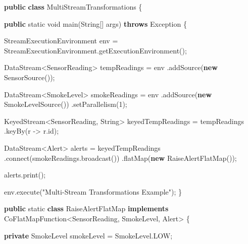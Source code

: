 \documentclass[cn,11pt,chinese]{elegantbook}
\newenvironment{Shaded}{}{}
\newcommand{\BuiltInTok}[1]{#1}
\newcommand{\DataTypeTok}[1]{\textcolor[rgb]{0.56,0.13,0.00}{#1}}
\newcommand{\DecValTok}[1]{\textcolor[rgb]{0.25,0.63,0.44}{#1}}
\newcommand{\FunctionTok}[1]{\textcolor[rgb]{0.02,0.16,0.49}{#1}}
\newcommand{\KeywordTok}[1]{\textcolor[rgb]{0.00,0.44,0.13}{\textbf{#1}}}
\newcommand{\NormalTok}[1]{#1}
\newcommand{\StringTok}[1]{\textcolor[rgb]{0.25,0.44,0.63}{#1}}
\begin{document}
\begin{Shaded}
\begin{Highlighting}[]
\KeywordTok{public} \KeywordTok{class}\NormalTok{ MultiStreamTransformations \{}

    \KeywordTok{public} \DataTypeTok{static} \DataTypeTok{void} \FunctionTok{main}\NormalTok{(}\BuiltInTok{String}\NormalTok{[] args) }\KeywordTok{throws} \BuiltInTok{Exception}\NormalTok{ \{}

\NormalTok{        StreamExecutionEnvironment env = StreamExecutionEnvironment.}\FunctionTok{getExecutionEnvironment}\NormalTok{();}

\NormalTok{        DataStream\textless{}SensorReading\textgreater{} tempReadings = env}
\NormalTok{                .}\FunctionTok{addSource}\NormalTok{(}\KeywordTok{new} \FunctionTok{SensorSource}\NormalTok{());}

\NormalTok{        DataStream\textless{}SmokeLevel\textgreater{} smokeReadings = env}
\NormalTok{                .}\FunctionTok{addSource}\NormalTok{(}\KeywordTok{new} \FunctionTok{SmokeLevelSource}\NormalTok{())}
\NormalTok{                .}\FunctionTok{setParallelism}\NormalTok{(}\DecValTok{1}\NormalTok{);}

\NormalTok{        KeyedStream\textless{}SensorReading, }\BuiltInTok{String}\NormalTok{\textgreater{} keyedTempReadings = tempReadings}
\NormalTok{                .}\FunctionTok{keyBy}\NormalTok{(r {-}\textgreater{} r.}\FunctionTok{id}\NormalTok{);}

\NormalTok{        DataStream\textless{}Alert\textgreater{} alerts = keyedTempReadings}
\NormalTok{                .}\FunctionTok{connect}\NormalTok{(smokeReadings.}\FunctionTok{broadcast}\NormalTok{())}
\NormalTok{                .}\FunctionTok{flatMap}\NormalTok{(}\KeywordTok{new} \FunctionTok{RaiseAlertFlatMap}\NormalTok{());}

\NormalTok{        alerts.}\FunctionTok{print}\NormalTok{();}

\NormalTok{        env.}\FunctionTok{execute}\NormalTok{(}\StringTok{"Multi{-}Stream Transformations Example"}\NormalTok{);}
\NormalTok{    \}}

    \KeywordTok{public} \DataTypeTok{static} \KeywordTok{class}\NormalTok{ RaiseAlertFlatMap }\KeywordTok{implements}\NormalTok{ CoFlatMapFunction\textless{}SensorReading, SmokeLevel, Alert\textgreater{} \{}

        \KeywordTok{private}\NormalTok{ SmokeLevel smokeLevel = SmokeLevel.}\FunctionTok{LOW}\NormalTok{;}


\end{Highlighting}
\end{Shaded}
\end{document}
